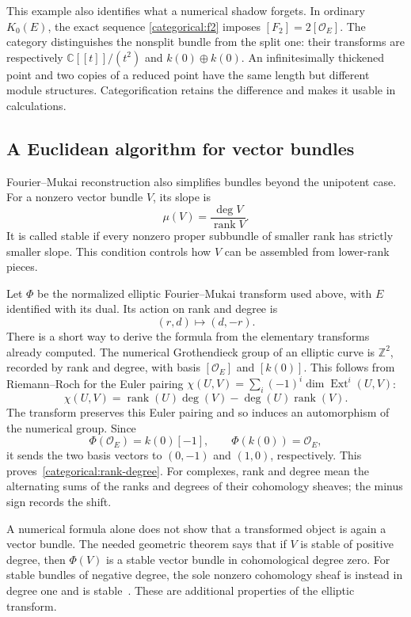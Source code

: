 \documentclass[11pt]{article}
\theoremstyle{remark}
\begin{document}
This example also identifies what a numerical shadow forgets. In ordinary \(K_0(E)\), the exact sequence \eqref{categorical:f2} imposes \([F_2]=2[\mathcal O_E]\). The category distinguishes the nonsplit bundle from the split one: their transforms are respectively \(\mathbb C[[t]]/(t^2)\) and \(k(0)\oplus k(0)\). An infinitesimally thickened point and two copies of a reduced point have the same length but different module structures. Categorification retains the difference and makes it usable in calculations.


\subsection{A Euclidean algorithm for vector bundles}
\label{categorical:euclidean-bundles}

Fourier--Mukai reconstruction also simplifies bundles beyond the unipotent case. For a nonzero vector bundle \(V\), its slope is
\[
\mu(V)=\frac{\deg V}{\operatorname{rank}V}.
\]
It is called stable if every nonzero proper subbundle of smaller rank has strictly smaller slope. This condition controls how \(V\) can be assembled from lower-rank pieces.

Let \(\Phi\) be the normalized elliptic Fourier--Mukai transform used above, with \(E\) identified with its dual. Its action on rank and degree is
\begin{equation}
(r,d)\longmapsto(d,-r).
\label{categorical:rank-degree}
\end{equation}
There is a short way to derive the formula from the elementary transforms already computed. The numerical Grothendieck group of an elliptic curve is \(\mathbb Z^2\), recorded by rank and degree, with basis \([\mathcal O_E]\) and \([k(0)]\). This follows from Riemann--Roch for the Euler pairing \(\chi(U,V)=\sum_i(-1)^i\dim\operatorname{Ext}^i(U,V)\):
\[
\chi(U,V)=\operatorname{rank}(U)\deg(V)-\deg(U)\operatorname{rank}(V).
\]
The transform preserves this Euler pairing and so induces an automorphism of the numerical group. Since
\[
\Phi(\mathcal O_E)=k(0)[-1],\qquad
\Phi(k(0))=\mathcal O_E,
\]
it sends the two basis vectors to \((0,-1)\) and \((1,0)\), respectively. This proves~\eqref{categorical:rank-degree}. For complexes, rank and degree mean the alternating sums of the ranks and degrees of their cohomology sheaves; the minus sign records the shift.

A numerical formula alone does not show that a transformed object is again a vector bundle. The needed geometric theorem says that if \(V\) is stable of positive degree, then \(\Phi(V)\) is a stable vector bundle in cohomological degree zero. For stable bundles of negative degree, the sole nonzero cohomology sheaf is instead in degree one and is stable~\cite{ruiperez-tejero}. These are additional properties of the elliptic transform.
\end{document}
